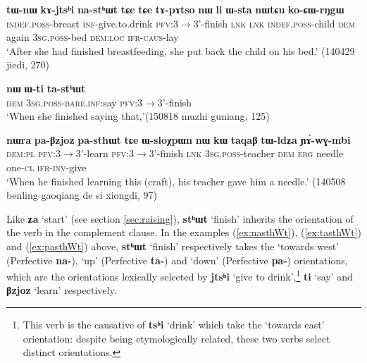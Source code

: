 \documentclass[oneside,a4paper,11pt]{article}
\newcommand{\ipa}[1]{\textbf{\phon#1}} %
\newcommand{\jpg}[2]{\ipa{#1} `#2'} %
\begin{document}
\begin{exe}
\ex \label{ex:nasthWt}
\gll \ipa{tɯ-nɯ} 	\ipa{kɤ-jtsʰi} 	\ipa{na-stʰɯt} 	\ipa{tɕe} 	\ipa{tɕe} 	\ipa{tɤ-pɤtso} 	\ipa{nɯ} 	\ipa{li} 	\ipa{ɯ-sta} 	\ipa{nɯtɕu} 	\ipa{ko-ɕɯ-rŋgɯ} 	\\
\textsc{indef.poss}-breast \textsc{inf}-give.to.drink \textsc{pfv}:3$\rightarrow$3'-finish \textsc{lnk} \textsc{lnk} \textsc{indef.poss}-child \textsc{dem} again \textsc{3sg.poss}-bed \textsc{dem:loc} \textsc{ifr-caus}-lay \\
\glt `After she had finished breastfeeding, she put back the child on his bed.' (140429 jiedi, 270)
\end{exe}

\begin{exe}
\ex \label{ex:tasthWt}
\gll
\ipa{nɯ} 	\ipa{ɯ-ti} 	\ipa{ta-stʰɯt} \\
\textsc{dem} \textsc{3sg.poss-bare.inf}:say \textsc{pfv}:3$\rightarrow$3'-finish \\
\glt `When she finished saying that,'(150818 muzhi guniang, 125)
\end{exe}

\begin{exe}
\ex \label{ex:pasthWt}
\gll 	\ipa{nɯra} 	\ipa{pa-βzjoz}	\ipa{pa-sthɯt} \ipa{tɕe} \ipa{ɯ-sloχpɯn} 	\ipa{nɯ} 	\ipa{kɯ} 	\ipa{taqaβ} 	\ipa{tɯ-ldʑa} 	\ipa{ɲɤ́-wɣ-mbi} 
\\
 \textsc{dem:pl} \textsc{pfv}:3$\rightarrow$3'-learn \textsc{pfv}:3$\rightarrow$3'-finish \textsc{lnk} \textsc{3sg.poss}-teacher \textsc{dem} \textsc{erg} needle one-\textsc{cl} \textsc{ifr-inv}-give  \\
\glt `When he finished learning this (craft), his teacher gave him a needle.' (140508 benling gaoqiang de si xiongdi, 97)
\end{exe} 

Like \jpg{ʑa}{start} (see section \ref{sec:raising}), \jpg{stʰɯt}{finish} inherits the orientation of the verb in the complement clause. In the examples (\ref{ex:nasthWt}),  (\ref{ex:tasthWt}) and (\ref{ex:pasthWt}) above, \jpg{stʰɯt}{finish} respectively takes the `towards west' (Perfective \ipa{na-}), `up' (Perfective \ipa{ta-}) and `down' (Perfective \ipa{pa-}) orientations, which are the orientations lexically selected by \jpg{jtsʰi}{give to drink},\footnote{This verb is the causative of \jpg{tsʰi}{drink} which take the `towards east' orientation: despite being etymologically related, these two verbs select distinct orientations.}  \jpg{ti}{say} and \jpg{βzjoz}{learn} respectively.
\end{document}
